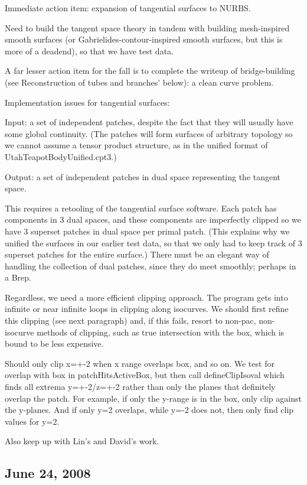 \documentclass[11pt]{article}
\begin{document}
Immediate action item: expansion of tangential surfaces to NURBS.

Need to build the tangent space theory in tandem with building mesh-inspired smooth surfaces
(or Gabrielides-contour-inspired smooth surfaces, but this is more of a deadend),
so that we have test data.

A far lesser action item for the fall is to complete the writeup of bridge-building
(see Reconstruction of tubes and branches' below): a clean curve problem.


Implementation issues for tangential surfaces:

Input: a set of independent patches, despite the fact that they will usually have some
global continuity.
(The patches will form surfaces of arbitrary topology so we cannot assume a tensor
product structure, as in the unified format of UtahTeapotBodyUnified.cpt3.)

Output: a set of independent patches in dual space representing the tangent space.

This requires a retooling of the tangential surface software.
Each patch has components in 3 dual spaces, and these components are imperfectly
clipped so we have 3 superset patches in dual space per primal patch.
(This explains why we unified the surfaces in our earlier test data, so that
we only had to keep track of 3 superset patches for the entire surface.)
There must be an elegant way of handling the collection of dual patches, since they do meet smoothly;
perhaps in a Brep.

Regardless, we need a more efficient clipping approach.
The program gets into infinite or near infinite loops in clipping along isocurves.
We should first refine this clipping (see next paragraph) and, if this fails,
resort to non-pac, non-isocurve methods of clipping, such as true intersection with the box,
which is bound to be less expensive.

Should only clip x=+-2 when x range overlaps box, and so on.
We test for overlap with box in patchHitsActiveBox, but then call defineClipIsoval
which finds all extrema y=+-2/z=+-2 rather than only the planes that definitely overlap the patch.
For example, if only the y-range is in the box, only clip against the y-planes.
And if only y=2 overlaps, while y=-2 does not, then only find clip values for y=2.

Also keep up with Lin's and David's work.

\subsection{June 24, 2008}
\end{document}
